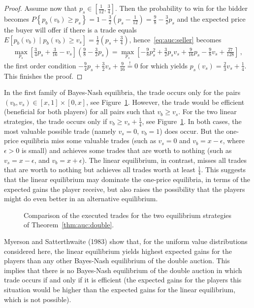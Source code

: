 \begin{proof}
Assume now that $p_s \in [\frac{1}{12},\frac{3}{4}]$.
Then the probability to win for the bidder becomes $P \left\{p_b(v_b) \geq p_s \right\} = 1 - \frac{3}{2}\left(p_s - \frac{1}{12} \right)=\frac{9}{8}- \frac{3}{2} p_s$ and the expected price the buyer will offer if there is a trade equals $E\left[p_b(v_b) \mid p_b(v_b) \geq v_s\right] = \frac{1}{2}\left(p_s + \frac{3}{4} \right)$, hence~\eqref{eq:auc:seller} becomes
\begin{align*}
 \max_{p_s} \left[\frac{3}{4}p_s + \frac{3}{16}  - v_s \right] \left(\frac{9}{8} - \frac{3}{2} p_s \right) =  \max_{p_s} \left[-\frac{9}{8} p_s^2 + \frac{3}{2} p_s v_s + \frac{9}{16} p_s - \frac{9}{8} v_s +  \frac{27}{128} \right]\,,
\end{align*} 
the first order condition $-\frac{9}{4} p_s + \frac{3}{2} v_s + \frac{9}{16} \stackrel{!}{=} 0$ for which yields $p_s(v_s) = \frac{2}{3} v_s + \frac{1}{4}$. This finishes the proof.
\end{proof}

In the first family of Bayes-Nash equilibria, the trade occurs only for the pairs $(v_b,v_s) \in [x,1] \times [0,x]$, see Figure~\ref{fig:auc:trade}. However, the trade would be efficient (beneficial for both players) for all pairs such that $v_b \geq v_s$. For the two linear strategies, the trade occurs only if $v_b \geq v_s + \frac{1}{4}$, see Figure~\ref{fig:auc:trade}.
In both cases, the most valuable possible trade (namely $v_s = 0$, $v_b = 1$) does occur. But the one-price equilibria miss some valuable trades (such as $v_s = 0$ and $v_b = x-\epsilon$, where $\epsilon > 0$ is small) and achieves some trades that are worth to nothing (such as $v_s = x- \epsilon$, and $v_b = x + \epsilon$). The linear equilibrium, in contrast, misses all trades that are worth to nothing but achieves all trades worth at least $\frac{1}{4}$. This suggests that the linear equilibrium may dominate the one-price equilibria, in terms of the expected gains the player receive, but also raises the possibility that the players might do even better in an alternative equilibrium.

\begin{figure}[h!t]
\hfill  \hfill\null
\caption{Comparison of the executed trades for the two equilibrium strategies of Theorem~\ref{thm:auc:double}.}
\label{fig:auc:trade}
\end{figure}

Myerson and Satterthwaite (1983) show that, for the uniform value distributions considered here, the linear equilibrium yields highest expected gains for the players than any other Bayes-Nash equilibrium of the double auction. This implies that there is no Bayes-Nash equilibrium of the double auction in which trade occurs if and only if it is efficient (the expected gains for the players this situation would be higher than the expected gains for the linear equilibrium, which is not possible).



\ifx \globalmark \undefined %


	
\else 
	
\fi
